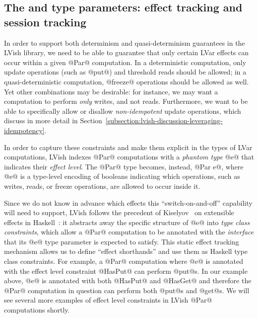 \subsection{The  and  type parameters: effect tracking and session tracking}

In order to support both determinism and quasi-determinism guarantees
in the LVish library, we need to be able to guarantee that only
certain LVar effects can occur within a given @Par@ computation.  In a
deterministic computation, only update operations (such as @put@) and
threshold reads should be allowed; in a quasi-deterministic
computation, @freeze@ operations should be allowed as well.  Yet other
combinations may be desirable: for instance, we may want a computation
to perform \emph{only} writes, and not reads.  Furthermore, we want to
be able to specifically allow or disallow \emph{non-idempotent} update
operations, which  discuss in more detail in
Section~\ref{subsection:lvish-discussion-leveraging-idempotency}.

In order to capture these constraints and make them explicit in the
types of LVar computations, LVish indexes @Par@ computations with a
\emph{phantom type} @e@ that indicates their \emph{effect level}.  The
@Par@ type becomes, instead, @Par e@, where @e@ is a type-level
encoding of booleans indicating which operations, such as writes,
reads, or freeze operations, are allowed to occur inside it.


Since we do not know in advance which effects this
``switch-on-and-off'' capability will need to support, LVish follows
the precedent of Kiselyov \etal~on extensible effects in
Haskell~\cite{oleg-amr-haskell-2013}: it abstracts away the specific
structure of @e@ into \emph{type class constraints}, which allow a
@Par@ computation to be annotated with the \emph{interface} that its
@e@ type parameter is expected to satisfy.  This static effect
tracking mechanism allows us to define ``effect shorthands'' and use
them as Haskell type class constraints.  For example, a @Par@
computation where @e@ is annotated with the effect level constraint
@HasPut@ can perform @put@s.  In our example above, @e@ is annotated
with both @HasPut@ and @HasGet@ and therefore the @Par@ computation in
question can perform both @put@s and @get@s.  We will see several more
examples of effect level constraints in LVish @Par@ computations
shortly.


